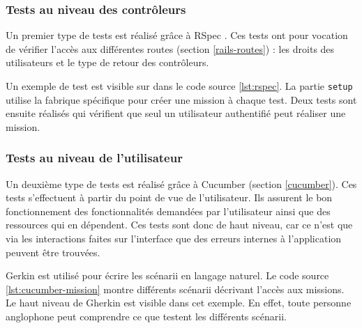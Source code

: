 \subsubsection{Tests au niveau des contrôleurs}
Un premier type de tests est réalisé grâce à RSpec \cite{rspec}. Ces tests ont pour vocation de vérifier l'accès aux différentes routes (section \ref{rails-routes}) : les droits des utilisateurs et le type de retour des contrôleurs.

Un exemple de test est visible sur dans le code source \ref{lst:rspec}. La partie \texttt{setup} utilise la fabrique spécifique pour créer une \gls{mission} à chaque test. Deux tests sont ensuite réalisés qui vérifient que seul un utilisateur authentifié peut réaliser une \gls{mission}.

\begin{figure}

\end{figure}

\subsubsection{Tests au niveau de l'utilisateur}
Un deuxième type de tests est réalisé grâce à Cucumber (section \ref{cucumber}). Ces tests s'effectuent à partir du point de vue de l'utilisateur. Ils assurent le bon fonctionnement des fonctionnalités demandées par l'utilisateur ainsi que des ressources qui en dépendent. Ces tests sont donc de haut niveau, car ce n'est que via les interactions faites sur l'interface que des erreurs internes à l'application peuvent être trouvées.

\begin{figure}

\end{figure}

\begin{figure}

\end{figure}

Gerkin est utilisé pour écrire les scénarii en langage naturel.
Le code source \ref{lst:cucumber-mission} montre différents scénarii décrivant l'accès aux \glspl{mission}. Le haut niveau de Gherkin est visible dans cet exemple. En effet, toute personne anglophone peut comprendre ce que testent les différents scénarii.


